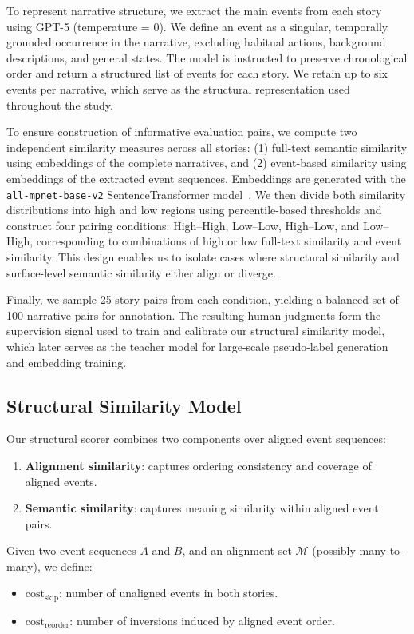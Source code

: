 To represent narrative structure, we extract the main events from each story using GPT-5 (temperature = 0). We define an event as a singular, temporally grounded occurrence in the narrative, excluding habitual actions, background descriptions, and general states. The model is instructed to preserve chronological order and return a structured list of events for each story. We retain up to six events per narrative, which serve as the structural representation used throughout the study.

To ensure construction of informative evaluation pairs, we compute two independent similarity measures across all stories: (1) full-text semantic similarity using embeddings of the complete narratives, and (2) event-based similarity using embeddings of the extracted event sequences. Embeddings are generated with the \texttt{all-mpnet-base-v2} SentenceTransformer model~\cite{reimers2019sentence}. We then divide both similarity distributions into high and low regions using percentile-based thresholds and construct four pairing conditions: High--High, Low--Low, High--Low, and Low--High, corresponding to combinations of high or low full-text similarity and event similarity. This design enables us to isolate cases where structural similarity and surface-level semantic similarity either align or diverge.

Finally, we sample 25 story pairs from each condition, yielding a balanced set of 100 narrative pairs for annotation. The resulting human judgments form the supervision signal used to train and calibrate our structural similarity model, which later serves as the teacher model for large-scale pseudo-label generation and embedding training.

\subsection{Structural Similarity Model}

Our structural scorer combines two components over aligned event sequences:
\begin{enumerate}
    \item \textbf{Alignment similarity}: captures ordering consistency and coverage of aligned events.
    \item \textbf{Semantic similarity}: captures meaning similarity within aligned event pairs.
\end{enumerate}

Given two event sequences $A$ and $B$, and an alignment set $\mathcal{M}$ (possibly many-to-many), we define:
\begin{itemize}
    \item $\text{cost}_{\text{skip}}$: number of unaligned events in both stories.
    \item $\text{cost}_{\text{reorder}}$: number of inversions induced by aligned event order.
\end{itemize}

